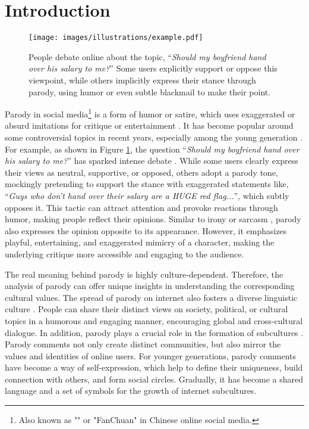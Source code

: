 \section{Introduction}

\begin{figure}[t]
  \texttt{[image: images/illustrations/example.pdf]}
  \caption{People debate online about the topic, ``\textit{Should my boyfriend hand over his salary to me?}'' Some users explicitly support or oppose this viewpoint, while others implicitly express their stance through parody, using humor or even subtle blackmail to make their point.}\vspace{-0.48cm}
  \label{fig:example_parody}
\end{figure}


Parody in social media\footnote{Also known as "" or "FanChuan" in Chinese online social media.} is a form of humor or satire, which uses exaggerated or absurd imitations for critique or entertainment \citep{parody_definition}. It has become popular around some controversial topics in recent years, especially among the young generation \citep{parody_young,parody_young2}. For example, as shown in Figure \ref{fig:example_parody}, the question ``\textit{Should my boyfriend hand over his salary to me?}'' has sparked intense debate \citep{news}. While some users clearly express their views as \textcolor{neu}{neutral}, \textcolor{pos}{supportive}, or \textcolor{neg}{opposed}, others adopt a \textcolor{orp}{parody} tone, mockingly pretending to support the stance with exaggerated statements like, ``\textit{Guys who don’t hand over their salary are a HUGE red flag...}'', which subtly opposes it. This tactic can attract attention and provoke reactions through humor, making people reflect their opinions. Similar to irony or sarcasm \citep{topic_gender_EPIC}, parody also expresses the opinion opposite to its appearance. However, it emphasizes playful, entertaining, and exaggerated mimicry of a character, making the underlying critique more accessible and engaging to the audience.

The real meaning behind parody is highly culture-dependent. Therefore, the analysis of parody can offer unique insights in understanding the corresponding cultural values. The spread of parody on internet also fosters a diverse linguistic culture \citep{menghini2024digital}. People can share their distinct views on society, political, or cultural topics in a humorous and engaging manner, encouraging global and cross-cultural dialogue. In addition, parody plays a crucial role in the formation of subcultures \citep{willett2009parodic,booth2014slash}. Parody comments not only create distinct communities, but also mirror the values and identities of online users. For younger generations, parody comments have become a way of self-expression, which help to define their uniqueness, build connection with others, and form social circles. Gradually, it has become a shared language and a set of symbols for the growth of internet subcultures. 

